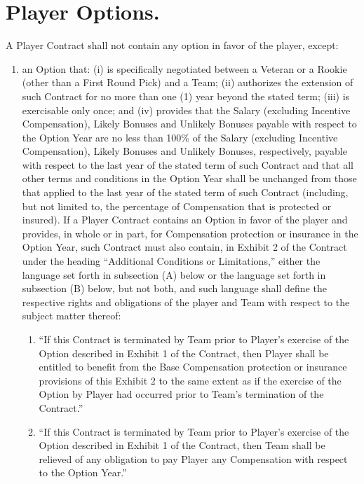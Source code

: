 \documentclass[
]{book}
\providecommand{\tightlist}{%
  \setlength{\itemsep}{0pt}\setlength{\parskip}{0pt}}
\begin{document}
\hypertarget{player-options.}{%
\section{Player Options.}\label{player-options.}}

A Player Contract shall not contain any option in favor of the player, except:

\begin{enumerate}
\def\labelenumi{(\alph{enumi})}
\tightlist
\item
  an Option that: (i) is specifically negotiated between a Veteran or a Rookie (other than a First Round Pick) and a Team; (ii) authorizes the extension of such Contract for no more than one (1) year beyond the stated term; (iii) is exercisable only once; and (iv) provides that the Salary (excluding Incentive Compensation), Likely Bonuses and Unlikely Bonuses payable with respect to the Option Year are no less than 100\% of the Salary (excluding Incentive Compensation), Likely Bonuses and Unlikely Bonuses, respectively, payable with respect to the last year of the stated term of such Contract and that all other terms and conditions in the Option Year shall be unchanged from those that applied to the last year of the stated term of such Contract (including, but not limited to, the percentage of Compensation that is protected or insured). If a Player Contract contains an Option in favor of the player and provides, in whole or in part, for Compensation protection or insurance in the Option Year, such Contract must also contain, in Exhibit 2 of the Contract under the heading ``Additional Conditions or Limitations,'' either the language set forth in subsection (A) below or the language set forth in subsection (B) below, but not both, and such language shall define the respective rights and obligations of the player and Team with respect to the subject matter thereof:

  \begin{enumerate}
  \def\labelenumii{(\Alph{enumii})}
  \tightlist
  \item
    ``If this Contract is terminated by Team prior to Player's exercise of the Option described in Exhibit 1 of the Contract, then Player shall be entitled to benefit from the Base Compensation protection or insurance provisions of this Exhibit 2 to the same extent as if the exercise of the Option by Player had occurred prior to Team's termination of the Contract.''
  \item
    ``If this Contract is terminated by Team prior to Player's exercise of the Option described in Exhibit 1 of the Contract, then Team shall be relieved of any obligation to pay Player any Compensation with respect to the Option Year.''
  \end{enumerate}


\end{enumerate}
\end{document}
